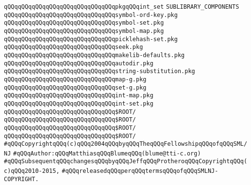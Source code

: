 \verb|qQQqqQQqqQQqqQQqqQQqqQQqqQQqqQQqpkgqQQqint_set|\newline
\newline
\newline
\newline
\verb|SUBLIBRARY_COMPONENTS|\newline
\newline
\verb|qQQqqQQqqQQqqQQqqQQqqQQqqQQqqQQqsymbol-ord-key.pkg|\newline
\verb|qQQqqQQqqQQqqQQqqQQqqQQqqQQqqQQqsymbol-set.pkg|\newline
\verb|qQQqqQQqqQQqqQQqqQQqqQQqqQQqqQQqsymbol-map.pkg|\newline
\verb|qQQqqQQqqQQqqQQqqQQqqQQqqQQqqQQqpicklehash-set.pkg|\newline
\verb|qQQqqQQqqQQqqQQqqQQqqQQqqQQqqQQqseek.pkg|\newline
\verb|qQQqqQQqqQQqqQQqqQQqqQQqqQQqqQQqmakelib-defaults.pkg|\newline
\verb|qQQqqQQqqQQqqQQqqQQqqQQqqQQqqQQqautodir.pkg|\newline
\verb|qQQqqQQqqQQqqQQqqQQqqQQqqQQqqQQqstring-substitution.pkg|\newline
\newline
\verb|qQQqqQQqqQQqqQQqqQQqqQQqqQQqqQQqmap-g.pkg|\newline
\verb|qQQqqQQqqQQqqQQqqQQqqQQqqQQqqQQqset-g.pkg|\newline
\verb|qQQqqQQqqQQqqQQqqQQqqQQqqQQqqQQqint-map.pkg|\newline
\verb|qQQqqQQqqQQqqQQqqQQqqQQqqQQqqQQqint-set.pkg|\newline
\newline
\verb|qQQqqQQqqQQqqQQqqQQqqQQqqQQqqQQq$ROOT/|\newline
\verb|qQQqqQQqqQQqqQQqqQQqqQQqqQQqqQQq$ROOT/|\newline
\verb|qQQqqQQqqQQqqQQqqQQqqQQqqQQqqQQq$ROOT/|\newline
\newline
\verb|qQQqqQQqqQQqqQQqqQQqqQQqqQQqqQQq$ROOT/|\newline
\newline
\newline
\verb|#qQQqCopyrightqQQq(c)qQQq2004qQQqbyqQQqTheqQQqFellowshipqQQqofqQQqSML/NJ|\newline
\verb|#qQQqAuthor:qQQqMatthiasqQQqBlumeqQQq(blume@tti-c.org)|\newline
\verb|#qQQqSubsequentqQQqchangesqQQqbyqQQqJeffqQQqProtheroqQQqCopyrightqQQq(c)qQQq2010-2015,|\newline
\verb|#qQQqreleasedqQQqperqQQqtermsqQQqofqQQqSMLNJ-COPYRIGHT.|\newline

